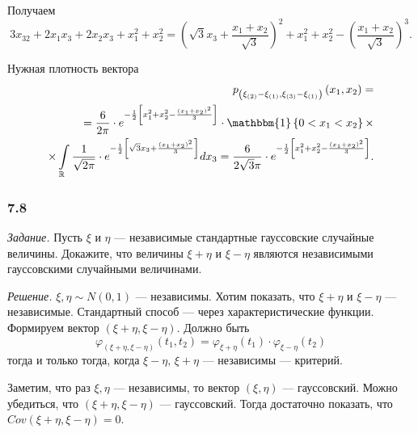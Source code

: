 \begin{enumerate}[label=\alph*)]
  Получаем
  $$3x_32 + 2x_1 x_3 + 2x_2 x_3 + x_1^2 + x_2^2 =
    \left( \sqrt{3} x_3 + \frac{x_1 + x_2}{ \sqrt{3}} \right)^2 + x_1^2 + x_2^2 -
    \left( \frac{x_1 + x_2}{ \sqrt{3}} \right)^3.$$

  Нужная плотность вектора
  \begin{equation*}
    \begin{split}
      p_{ \left( \xi_{ \left( 2 \right) } - \xi_{ \left( 1 \right) }, \xi_{ \left( 3 \right) } - \xi_{ \left( 1 \right) } \right) }
      \left( x_1, x_2 \right) = \\
      = \frac{6}{2 \pi } \cdot
      e^{- \frac{1}{2} \left[ x_1^2 + x_2^2 - \frac{ \left( x_1 + x_2 \right)^2}{3} \right] } \cdot
      \mathbbm{1} \left\{ 0 < x_1 < x_2 \right\} \times \\
      \times \int \limits_{ \mathbb{R}}
        \frac{1}{ \sqrt{2 \pi }} \cdot
        e^{- \frac{1}{2} \left[ \sqrt{3} x_3 + \frac{ \left( x_1 + x_2 \right)^2}{3} \right]}
      dx_3 =
      \frac{6}{2 \sqrt{3} \pi } \cdot
      e^{- \frac{1}{2} \left[ x_1^2 + x_2^2 - \frac{ \left( x_1 + x_2 \right)^2}{3} \right] }.
    \end{split}
  \end{equation*}
\end{enumerate}

\subsubsection{7.8}

\textit{Задание.}
Пусть $ \xi $ и $ \eta $ --- независимые стандартные гауссовские случайные величины.
Докажите,
что величины $ \xi + \eta $ и $ \xi - \eta $
являются независимыми гауссовскими случайными величинами.

\textit{Решение.} $ \xi, \eta \sim N \left(0, 1 \right) $ --- независимы.
Хотим показать, что $ \xi + \eta $ и $ \xi - \eta $ --- независимые.
Стандартный способ --- через характеристические функции.
Формируем вектор $ \left( \xi + \eta, \xi - \eta \right)$.
Должно быть
$$ \varphi_{ \left( \xi + \eta, \xi - \eta \right) } \left( t_1, t_2 \right) =
  \varphi_{ \xi + \eta } \left( t_1 \right) \cdot \varphi_{ \xi - \eta } \left( t_2 \right) $$
тогда и только тогда, когда $ \xi - \eta, \, \xi + \eta $ --- независимы --- критерий.

Заметим, что раз $ \xi, \eta $ --- независимы, то вектор $ \left( \xi, \eta \right) $ ---
гауссовский.
Можно убедиться, что $ \left( \xi + \eta, \xi - \eta \right) $ --- гауссовский.
Тогда достаточно показать, что $Cov \left( \xi + \eta, \xi - \eta \right) = 0$.

